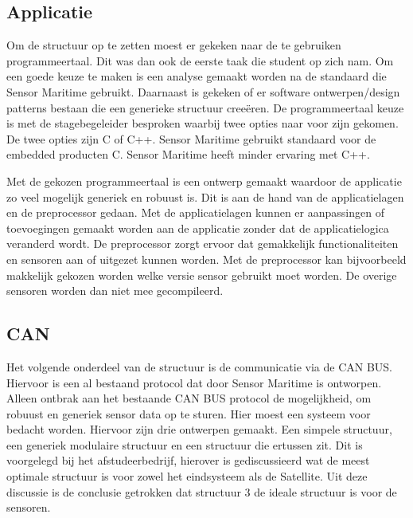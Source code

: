 \subsection{Applicatie}
Om de structuur op te zetten moest er gekeken naar de te gebruiken programmeertaal. Dit was dan ook de eerste taak die student op zich nam. Om een goede keuze te maken is een analyse gemaakt worden na de standaard die Sensor Maritime gebruikt. Daarnaast is gekeken of er software ontwerpen/design patterns bestaan die een generieke structuur creeëren. De programmeertaal keuze is met de stagebegeleider besproken waarbij twee opties naar voor zijn gekomen. De twee opties zijn C of C++. Sensor Maritime gebruikt standaard voor de embedded producten C. Sensor Maritime heeft minder ervaring met C++. \newline

\noindent Met de gekozen programmeertaal is een ontwerp gemaakt waardoor de applicatie zo veel mogelijk generiek en robuust is. Dit is aan de hand van de applicatielagen en de preprocessor gedaan. Met de applicatielagen kunnen er aanpassingen of toevoegingen gemaakt worden aan de applicatie zonder dat de applicatielogica veranderd wordt. De preprocessor zorgt ervoor dat gemakkelijk functionaliteiten en sensoren aan of uitgezet kunnen worden. Met de preprocessor kan bijvoorbeeld makkelijk gekozen worden welke versie sensor gebruikt moet worden. De overige sensoren worden dan niet mee gecompileerd.

\subsection{CAN}
Het volgende onderdeel van de structuur is de communicatie via de CAN BUS. Hiervoor is een al bestaand protocol dat door Sensor Maritime is ontworpen. Alleen ontbrak aan het bestaande CAN BUS protocol de mogelijkheid, om robuust en generiek sensor data op te sturen. Hier moest een systeem voor bedacht worden. Hiervoor zijn drie ontwerpen gemaakt. Een simpele structuur, een generiek modulaire structuur en een structuur die ertussen zit. Dit is voorgelegd bij het afstudeerbedrijf, hierover is gediscussieerd wat de meest optimale structuur is voor zowel het eindsysteem als de Satellite. Uit deze discussie is de conclusie getrokken dat structuur 3 de ideale structuur is voor de sensoren.

